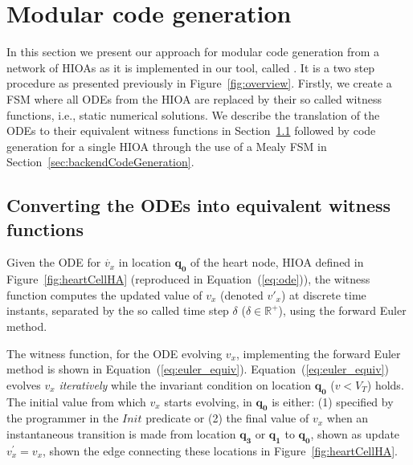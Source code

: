 \section{Modular code generation}
\label{sec:codeGen}

In this section we present our approach for modular code generation from
a network of \acp{HIOA} as it is implemented in our tool, called
\ourTool. It is a two step procedure as presented previously in
Figure~\ref{fig:overview}. Firstly, we create a \ac{FSM} where all \acp{ODE} 
from the \ac{HIOA} are replaced by their so called witness functions, i.e.,
static numerical solutions. We describe the translation of the \acp{ODE}
to their equivalent witness functions in
Section~\ref{sec:converting-odes-into} followed by code generation for a
single \ac{HIOA} through the use of a Mealy \ac{FSM} in
Section~\ref{sec:backendCodeGeneration}.

\subsection{Converting the \acp{ODE} into equivalent witness functions}
\label{sec:converting-odes-into}

Given the \ac{ODE} for $\dot{v_x}$ in location $\mathbf{q_0}$ of the
heart node, \ac{HIOA} defined in Figure~\ref{fig:heartCellHA}
(reproduced in Equation~(\ref{eq:ode})), the witness function computes
the updated value of $v_{x}$ (denoted $v'_{x}$) at discrete time
instants, separated by the so called time step $\delta$
($\delta \in \mathbb{R}^{+}$), using the forward Euler method.  

The witness function, for the \ac{ODE} evolving $v_{x}$, implementing
the forward Euler method is shown in Equation~(\ref{eq:euler_equiv}).
Equation~(\ref{eq:euler_equiv}) evolves $v_{x}$ \emph{iteratively} while
the invariant condition on location $\mathbf{q_{0}}$ ($v < V_{T}$)
holds. The initial value from which $v_{x}$ starts evolving, in
$\mathbf{q_{0}}$ is either: (1) specified by the programmer in the
$Init$ predicate or (2) the final value of $v_{x}$ when an instantaneous
transition is made from location $\mathbf{q_{3}}$ or $\mathbf{q_{1}}$ to 
$\mathbf{q_{0}}$, shown as update $v^{\prime}_{x} = v_{x}$, shown the edge 
connecting these locations in Figure~\ref{fig:heartCellHA}.

\setlength{\belowdisplayskip}{-0.5\baselineskip} 
\setlength{\belowdisplayshortskip}{-0.5\baselineskip}
\setlength{\abovedisplayskip}{-0.5\baselineskip} 
\setlength{\abovedisplayshortskip}{-0.5\baselineskip}

